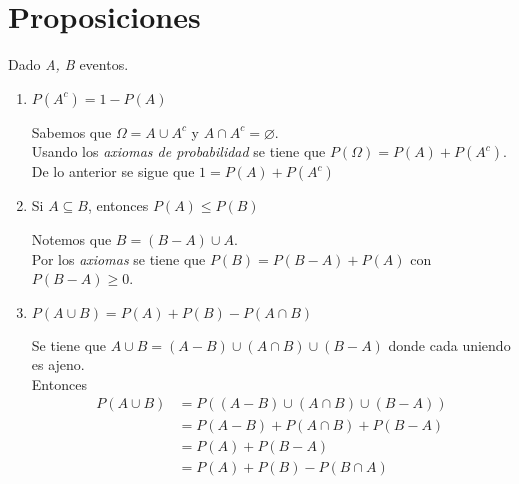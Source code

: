 \section{Proposiciones}
Dado \textit{A, B} eventos.
\begin{enumerate}
  \item $P(A^c) = 1 - P(A)$
    \begin{myproof}
      Sabemos que $\Omega = A \cup A^c$ y $A \cap A^c = \varnothing$. \\
      Usando los \textit{axiomas de probabilidad} se tiene que $P(\Omega) = P(A) + P(A^c)$.\\
      De lo anterior se sigue que $1 = P(A) + P(A^c)$
      \begin{center}  \end{center}
    \end{myproof}

    \newpage
  \item Si $A \subseteq B$, entonces $P(A) \le P(B)$
    \begin{myproof}
      Notemos que $B = (B - A) \cup A$.\\ 
      Por los \textit{axiomas} se tiene que $P(B) = P(B-A) + P(A)$ con $P(B - A) \ge 0$.
      \begin{center}  \end{center}
    \end{myproof}
    
  \item $P(A \cup B) = P(A) + P(B) - P(A \cap B)$
    \begin{myproof}
      Se tiene que $A \cup B = (A - B) \cup (A \cap B) \cup (B - A)$ donde cada uniendo es ajeno.\\
      Entonces
      \begin{align*}
         P(A \cup B) &= P((A - B) \cup (A \cap B) \cup (B - A))\\
                  &= P(A-B) + P(A \cap B) + P(B-A)\\
                  &= P(A) + P(B-A)\\
                  &= P(A)  + P(B) - P(B \cap A)\\
      \end{align*}
    \end{myproof}
\end{enumerate}


